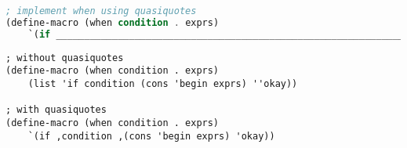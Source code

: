 \begin{lstlisting}[language=Scheme]
; implement when using quasiquotes
(define-macro (when condition . exprs)
    `(if __________________________________________________________________________________)
\end{lstlisting}

\begin{solution}
\begin{verbatim}
; without quasiquotes
(define-macro (when condition . exprs)
    (list 'if condition (cons 'begin exprs) ''okay))

; with quasiquotes
(define-macro (when condition . exprs)
    `(if ,condition ,(cons 'begin exprs) 'okay))
\end{verbatim}
\end{solution}


